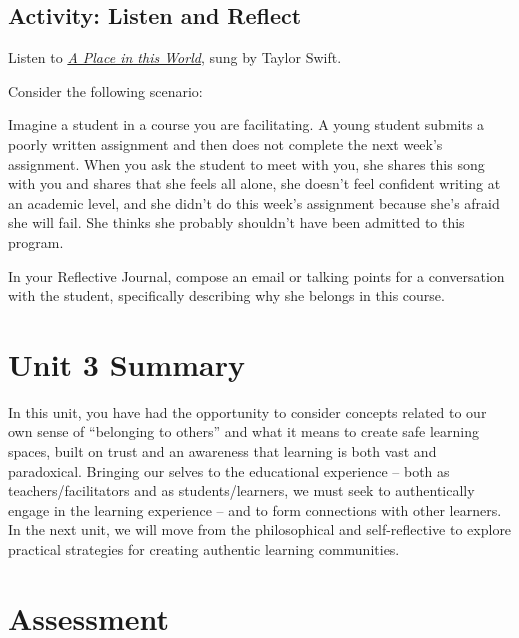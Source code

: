 \documentclass[
]{book}
\begin{document}
\hypertarget{activity-listen-and-reflect-1}{%
\subsection*{Activity: Listen and Reflect}\label{activity-listen-and-reflect-1}}

\begin{reflect}
Listen to
\href{https://music.youtube.com/watch?v=_FNQ5qLuLjA\&list=RDAMVM_FNQ5qLuLjA}{\emph{A
Place in this World}}, sung by Taylor Swift.

{Consider the following scenario:}

Imagine a student in a course you are facilitating. A young student
submits a poorly written assignment and then does not complete the next
week's assignment. When you ask the student to meet with you, she shares
this song with you and shares that she feels all alone, she doesn't feel
confident writing at an academic level, and she didn't do this week's
assignment because she's afraid she will fail. She thinks she probably
shouldn't have been admitted to this program.

In your Reflective Journal, compose an email or talking points for a
conversation with the student, specifically describing why she belongs
in this course.
\end{reflect}

\hypertarget{unit-3-summary}{%
\section*{Unit 3 Summary}\label{unit-3-summary}}

In this unit, you have had the opportunity to consider concepts related to our own sense of ``belonging to others'' and what it means to create safe learning spaces, built on trust and an awareness that learning is both vast and paradoxical. Bringing our selves to the educational experience -- both as teachers/facilitators and as students/learners, we must seek to authentically engage in the learning experience -- and to form connections with other learners. In the next unit, we will move from the philosophical and self-reflective to explore practical strategies for creating authentic learning communities.

\hypertarget{assessment-2}{%
\section*{Assessment}\label{assessment-2}}
\end{document}
